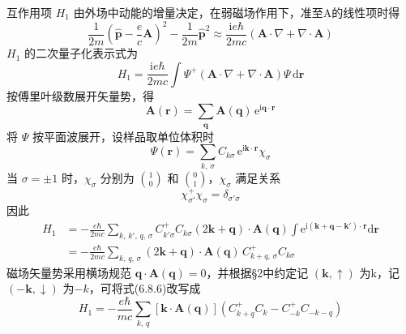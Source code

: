 互作用项 $H_{1}$ 由外场中动能的增量决定，在弱磁场作用下，准至A的线性项时得
\begin{equation}
  \frac{1}{2m}\left(\hat{\boldsymbol{p}}-\frac{e}{c}\boldsymbol{A}\right)^{2}
  -\frac{1}{2m}\hat{\boldsymbol{p}}^{2}
  \approx\frac{\mathrm{i}e\hbar}{2mc}
  \left(\boldsymbol{A}\cdot\nabla+\nabla\cdot\boldsymbol{A}\right)
\end{equation}
$H_{1}$ 的二次量子化表示式为
\begin{equation}
  H_{1}=\frac{\mathrm{i}e\hbar}{2mc}\int
  \Psi^{+}\left(\boldsymbol{A}\cdot\nabla+\nabla\cdot\boldsymbol{A}\right)
  \Psi\,\mathrm{d}\boldsymbol{r}
\end{equation}
按傅里叶级数展开矢量势，得
\begin{equation}
  \boldsymbol{A}(\boldsymbol{r})=\sum_{\boldsymbol{q}}
  \boldsymbol{A}(\boldsymbol{q})\,\mathrm{e}^{\mathrm{i}\boldsymbol{q}\cdot\boldsymbol{r}}
\end{equation}
将 $\Psi$ 按平面波展开，设样品取单位体积时
\begin{equation}
  \Psi(\boldsymbol{r})=\sum_{k,\,\sigma}C_{k\sigma}\,
  \mathrm{e}^{\mathrm{i}\boldsymbol{k}\cdot\boldsymbol{r}}\chi_{\sigma}
\end{equation}
当 $\sigma=\pm1$ 时，$\chi_{\sigma}$ 分别为 $\binom{1}{0}$ 和 $\binom{0}{1}$，$\chi_{\sigma}$ 满足关系
\begin{equation}
  \chi^{+}_{\sigma'}\chi_{\sigma}=\delta_{\sigma'\sigma}
\end{equation}
因此
\begin{equation}
\begin{aligned}
  H_{1}&=-\frac{e\hbar}{2mc}\sum_{k,\,k',\,q,\,\sigma}
  C^{+}_{k'\sigma}C_{k\sigma}\left(2\boldsymbol{k}+\boldsymbol{q}\right)
  \cdot\boldsymbol{A}(\boldsymbol{q})
  \int\mathrm{e}^{\mathrm{i}\left(\boldsymbol{k}+\boldsymbol{q}-\boldsymbol{k}'\right)
  \cdot\boldsymbol{r}}\mathrm{d}\boldsymbol{r}\\
  &=-\frac{e\hbar}{2mc}\sum_{k,\,q,\,\sigma}
  \left(2\boldsymbol{k}+\boldsymbol{q}\right)\cdot\boldsymbol{A}(\boldsymbol{q})\,
  C^{+}_{k+q,\,\sigma}C_{k\sigma}
\end{aligned}
\end{equation}
磁场矢量势采用横场规范 $\boldsymbol{q}\cdot\boldsymbol{A}(\boldsymbol{q})=0$，并根据§2中约定记 $(\boldsymbol{k},\uparrow)$ 为k，记 $(-\boldsymbol{k},\downarrow)$ 为$-k$，可将式(6.8.6)改写成
\begin{equation}
  H_{1}=-\frac{e\hbar}{mc}\sum_{k,\,q}
  \left[\boldsymbol{k}\cdot\boldsymbol{A}(\boldsymbol{q})\right]
  \left(C^{+}_{k+q}C_{k}-C^{+}_{-k}C_{-k-q}\right)
\end{equation}
